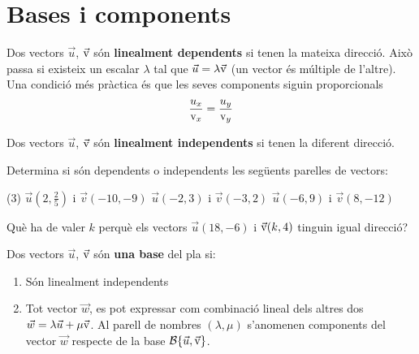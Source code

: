 \section{Bases i components}

 

\begin{theorybox}
	Dos vectors $\vec u$, $\vec{\mathrm{v}}$ són \textbf{linealment dependents} si tenen la mateixa direcció. Això passa si existeix un escalar $\lambda$ tal que $\vec u = \lambda \vec{\mathrm{v}}$ (un vector és múltiple de l'altre). Una condició més pràctica és que les seves components siguin proporcionals 
	\begin{equation}
	\label{eq:vect-align}
	 \dfrac{u_x}{\mathrm{v}_x} = \dfrac{u_y}{\mathrm{v}_y} 
	\end{equation} 
	 
	
	Dos vectors $\vec u$, $\vec{\mathrm{v}}$ són \textbf{linealment independents} si tenen la diferent direcció. 
\end{theorybox}


\begin{mylist}
	\exer Determina si són dependents o independents les següents parelles de vectors:
	\begin{tasks}(3)
		\task $\vec u \left(2, \frac{2}{5} \right)$	i 	 $\vec v(-10,-9)$
		\task $\vec u \left(-2, 3\right)$	i 	 $\vec v(-3, 2)$
		\task $\vec u \left(-6, 9 \right)$	i 	 $\vec v(8, -12)$
	\end{tasks}

\answers[cols=1]{[$\frac{2}{-10} \neq \frac{2/5}{-9}$ No, $\frac{-2}{3} \neq \frac{-3}{2}$ No, $\frac{-6}{8} = \frac{8}{-12}$ Sí perquè $\vec v = -\frac{4}{3}\vec u$]}
	
	\exer Què ha de valer $k$ perquè els vectors $\vec u(18, -6)$ i $\vec{\mathrm{v}}(k, 4)$ tinguin igual direcció?
	
\end{mylist}



\begin{theorybox}
	Dos vectors $\vec u$, $\vec{\mathrm{v}}$ són  \textbf{una base} del pla si: 
	\begin{enumerate}
		\item Són linealment independents
		\item Tot vector $\vec w$, es pot expressar com combinació lineal dels altres dos $\vec w = \lambda \vec u + \mu \vec{\mathrm{v}}$. Al parell de nombres $(\lambda, \mu)$ s'anomenen components del vector $\vec w$ respecte de la base $\mathcal{B}\{\vec u, \vec{\mathrm{v}}\}$.
	\end{enumerate} 
\end{theorybox}

